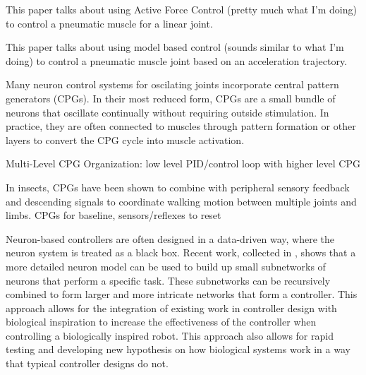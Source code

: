 
This paper talks about using Active Force Control (pretty much what I'm doing)
to control a pneumatic muscle for a linear joint.
\cite{Jahanabadi2009}

This paper talks about using model based control (sounds similar to what I'm 
doing) to control a pneumatic muscle joint based on an acceleration trajectory.
\cite{Wang2013}




Many neuron control systems for oscilating joints incorporate central pattern
generators (CPGs).
In their most reduced form, CPGs are a small bundle of
neurons that oscillate continually without requiring outside stimulation. In
practice, they are often connected to muscles through pattern formation or other
layers to convert the CPG cycle into muscle activation.
\cite{CPGReview}

Multi-Level CPG Organization: low level PID/control loop with higher level CPG
\cite{MultiLevelCPG}

In insects, CPGs have been shown to combine with peripheral sensory feedback and
descending signals to coordinate walking motion between multiple joints and
limbs.
CPGs for baseline, sensors/reflexes to reset \cite{SixLeggedWalking}


Neuron-based controllers are often designed in a data-driven way, where the
neuron system is treated as a black box. Recent work, collected in 
\cite{NickFunctionalSubnetwork}, shows that a more detailed neuron model can be
used to build up small subnetworks of neurons that perform a specific task.
These subnetworks can be recursively combined to form larger and more intricate
networks that form a controller. This approach allows for the integration of
existing work in controller design with biological inspiration to increase the
effectiveness of the controller when controlling a biologically inspired robot.
This approach also allows for rapid testing and developing new hypothesis on how
biological systems work in a way that typical controller designs do not.
